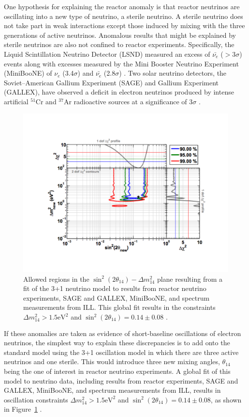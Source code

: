 One hypothesis for explaining the reactor anomaly is that reactor neutrinos are oscillating into a new type of neutrino, a sterile neutrino. 
A sterile neutrino does not take part in weak interactions except those induced by mixing with the three generations of active neutrinos.
Anomalous results that might be explained by sterile neutrinos are also not confined to reactor experiments.  
Specifically, the Liquid Scintillation Neutrino Detector (LSND)  measured an excess of $\bar{\nu_{e}}$ ($>$3$\sigma$) events \cite{Aguilar:2001ty} along with excesses measured by the Mini Booster Neutrino Experiment (MiniBooNE) of $\nu_{e}$ (3.4$\sigma$) and $\bar{\nu_{e}}$ (2.8$\sigma$) \cite{Aguilar-Arevalo:2013pmq}.
Two solar neutrino detectors, the Soviet–American Gallium Experiment (SAGE) and Gallium Experiment (GALLEX), have observed a deficit in electron neutrinos produced by intense artificial $^{51}$Cr and $^{37}$Ar radioactive sources at a significance of 3$\sigma$ \cite{Giunti:2010zu}.

\begin{figure}[!t]
	\centering
	\includegraphics[width=0.7\linewidth]{tex/3-reactorneutrinos-images/RAA_BestFitPoint}
	\caption{Allowed regions in the $\sin^2(2\theta_{14})-\Delta m^2_{14}$ plane resulting from a fit of the 3+1 neutrino model to results from reactor neutrino experiments, SAGE and GALLEX, MiniBooNE, and spectrum measurements from ILL. This global fit results in the constraints $\Delta m^2_{14} > 1.5 \textrm{eV}^2$ and $\sin^2(2\theta_{14}) = 0.14 \pm 0.08$ \cite{Mention:2011rk}.}
	\label{fig:raabestfitpoint}
\end{figure}

If these anomalies are taken as evidence of short-baseline oscillations of electron neutrinos, the simplest way to explain these discrepancies is to add onto the standard model using the 3+1 oscillation model in which there are three active neutrinos and one sterile. This would introduce three new mixing angles, $\theta_{14}$ being the one of interest in reactor neutrino experiments.
A global fit of this model to neutrino data, including results from reactor experiments, SAGE and GALLEX, MiniBooNE, and spectrum measurements from ILL, results in oscillation constraints $\Delta m^2_{14} > 1.5 \textrm{eV}^2$ and $\sin^2(2\theta_{14}) = 0.14 \pm 0.08$, as shown in Figure~\ref{fig:raabestfitpoint} \cite{Mention:2011rk}.


